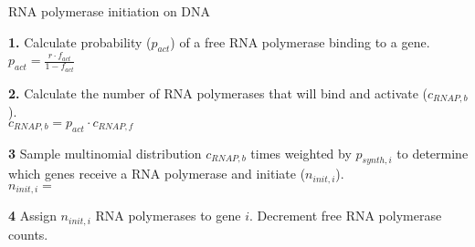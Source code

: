 \documentclass[12pt]{article}
\begin{document}
\begin{algorithm}[H]
\caption{RNA polymerase initiation on DNA}
\label{transcript_initiation_algorithm}

  \textbf{1.} Calculate probability ($p_{act}$) of a free RNA polymerase binding to a gene.\\
    \-\hspace{1cm} $p_{act} = \frac{r \cdot f_{act}}{1 - f_{act}}$

    \textbf{2.} Calculate the number of RNA polymerases that will bind and activate ($c_{RNAP,b}$).\\
    \-\hspace{1cm} $c_{RNAP,b} = p_{act} \cdot c_{RNAP,f}$

    \textbf{3} Sample multinomial distribution $c_{RNAP,b}$ times weighted by $p_{synth,i}$ to determine which genes receive a RNA polymerase and initiate ($n_{init,i}$).\\
    \-\hspace{1cm} $n_{init,i} =$ 

    \textbf{4} Assign $n_{init,i}$ RNA polymerases to gene $i$. Decrement free RNA polymerase counts.\\


\end{algorithm}
\newpage
\end{document}
